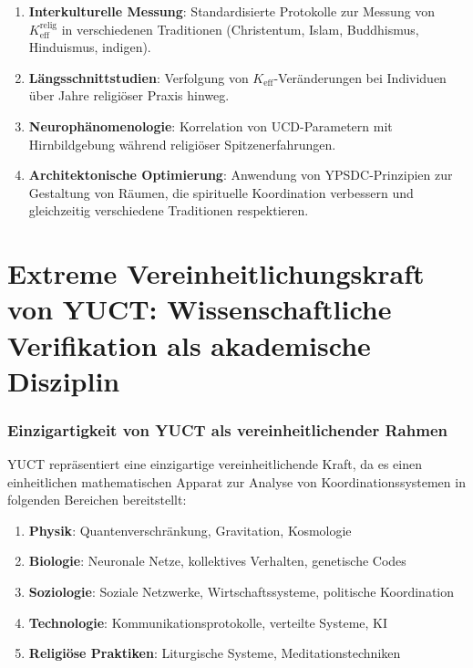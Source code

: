 \documentclass[12pt,a4paper]{article}
\begin{document}
	\begin{enumerate}
		\item \textbf{Interkulturelle Messung}: Standardisierte Protokolle zur Messung von $K_{\mathrm{eff}}^{\mathrm{relig}}$ in verschiedenen Traditionen (Christentum, Islam, Buddhismus, Hinduismus, indigen).
		
		\item \textbf{Längsschnittstudien}: Verfolgung von $K_{\mathrm{eff}}$-Veränderungen bei Individuen über Jahre religiöser Praxis hinweg.
		
		\item \textbf{Neurophänomenologie}: Korrelation von UCD-Parametern mit Hirnbildgebung während religiöser Spitzenerfahrungen.
		
		\item \textbf{Architektonische Optimierung}: Anwendung von YPSDC-Prinzipien zur Gestaltung von Räumen, die spirituelle Koordination verbessern und gleichzeitig verschiedene Traditionen respektieren.
	\end{enumerate}
	
	\newpage
	\part{Extreme Vereinheitlichungskraft von YUCT: Wissenschaftliche Verifikation als akademische Disziplin}
	
	\section{Einzigartigkeit von YUCT als vereinheitlichender Rahmen}
	
	YUCT repräsentiert eine einzigartige vereinheitlichende Kraft, da es einen einheitlichen mathematischen Apparat zur Analyse von Koordinationssystemen in folgenden Bereichen bereitstellt:
	
	\begin{enumerate}
		\item \textbf{Physik}: Quantenverschränkung, Gravitation, Kosmologie
		\item \textbf{Biologie}: Neuronale Netze, kollektives Verhalten, genetische Codes
		\item \textbf{Soziologie}: Soziale Netzwerke, Wirtschaftssysteme, politische Koordination
		\item \textbf{Technologie}: Kommunikationsprotokolle, verteilte Systeme, KI
		\item \textbf{Religiöse Praktiken}: Liturgische Systeme, Meditationstechniken
	\end{enumerate}
	
\end{document}
